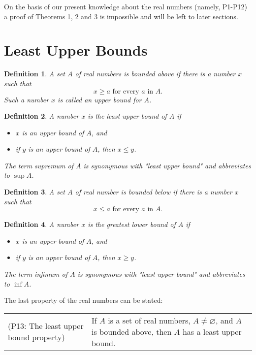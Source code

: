 \documentclass{article}
\numberwithin{definition}{subsection}
\newtheorem*{definition*}{Definition}
\numberwithin{lemma}{subsection}
\numberwithin{theorem}{subsection}
\begin{document}
On the basis of our present knowledge about the real numbers (namely, P1-P12)
a proof of Theorems 1, 2 and 3 is impossible and will be left to later
sections.

\section{Least Upper Bounds}

\begin{definition*}
  A set $A$ of real numbers is \emph{bounded above} if there is a number $x$
  such that \[
    x \geq a \text{ for every } a \text{ in } A.
  \] Such a number $x$ is called an \emph{upper bound} for $A$.
\end{definition*}

\begin{definition*}
  A number $x$ is the \emph{least upper bound} of $A$ if
  \begin{itemize}
    \item $x$ is an upper bound of $A$, and
    \item if $y$ is an upper bound of $A$, then $x \leq y$.
  \end{itemize}

  The term \emph{supremum} of $A$ is synonymous with "least upper bound" and
  abbreviates to $\sup A$.
\end{definition*}

\begin{definition*}
  A set $A$ of real number is \emph{bounded below} if there is a number $x$
  such that
  \[
    x \leq a \text{ for every } a \text{ in } A.
  \]
\end{definition*}

\begin{definition*}
  A number $x$ is the \emph{greatest lower bound} of $A$ if
  \begin{itemize}
    \item $x$ is an upper bound of $A$, and
    \item if $y$ is an upper bound of $A$, then $x \geq y$.
  \end{itemize}

  The term \emph{infimum} of $A$ is synonymous with "least upper bound" and
  abbreviates to $\inf A$.
\end{definition*}

The last property of the real numbers can be stated:

\begin{tabular}{l p{1.8in}}
  (P13: The least upper bound property) & If $A$ is a set of real numbers, $A
  \neq \varnothing$, and $A$ is bounded above, then $A$ has a least upper
  bound.
\end{tabular}
\end{document}
